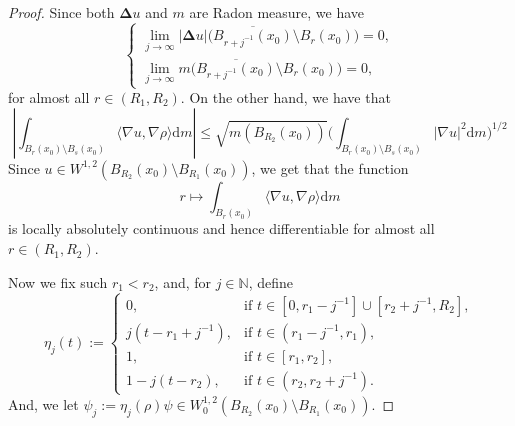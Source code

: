 \documentclass{article}
\theoremstyle{remark}
\numberwithin{equation}{section}
\theoremstyle{definition}
\begin{document}
    \begin{proof}
    	Since both $\mathbf{\Delta} u$ and $m$ are Radon measure, we have
    	\begin{equation}
    		\begin{cases}
    			\lim\limits_{j \to \infty} \left| \mathbf{\Delta} u \right|\big(\overline{B_{r + j^{-1}}(x_{0})} \setminus B_{r}(x_{0})\big) = 0,\\
    			\lim\limits_{j \to \infty} m\big(\overline{B_{r + j^{-1}}(x_{0})} \setminus B_{r}(x_{0})\big) = 0,
    		\end{cases}
    	\end{equation}
        for almost all $r \in (R_{1},R_{2})$. On the other hand, we have that
        \begin{equation}
        	\left| \int_{B_{r}(x_{0}) \setminus B_{s}(x_{0})} \langle \nabla u, \nabla \rho \rangle \mathrm{d}m \right| \le \sqrt{m(B_{R_{2}}(x_{0}))} \Big( \int_{B_{r}(x_{0}) \setminus B_{s}(x_{0})} \left| \nabla u \right|^{2} \mathrm{d}m \Big)^{1/2}
        \end{equation}
        Since $u \in W^{1,2}(B_{R_{2}}(x_{0})\setminus B_{R_{1}}(x_{0}))$, we get that the function
        \begin{equation}
        	r \mapsto \int_{B_{r}(x_{0})} \langle \nabla u, \nabla \rho \rangle \mathrm{d}m
        \end{equation}
    is locally absolutely continuous and hence differentiable for almost all $r \in (R_{1},R_{2})$.
    
    Now we fix such $r_{1} < r_{2}$, and, for $j \in \mathbb{N}$, define
    \begin{equation}
    	\eta_{j} (t) := \begin{cases}
    		0, & \text{if } t \in [0,r_{1} - j^{-1}] \cup [r_{2} + j^{-1},R_{2}],\\
    		j(t - r_{1} + j^{-1}), & \text{if } t \in (r_{1} - j^{-1},r_{1}),\\
    		1, & \text{if } t \in [r_{1},r_{2}],\\
    		1 - j(t -r_{2}), & \text{if } t \in (r_{2},r_{2} + j^{-1}).
    	\end{cases}
    \end{equation}
    And, we let $\psi_{j} := \eta_{j}(\rho) \psi \in W^{1,2}_{0}(B_{R_{2}}(x_{0}) \setminus B_{R_{1}}(x_{0}))$.
    

\end{proof}
\end{document}
